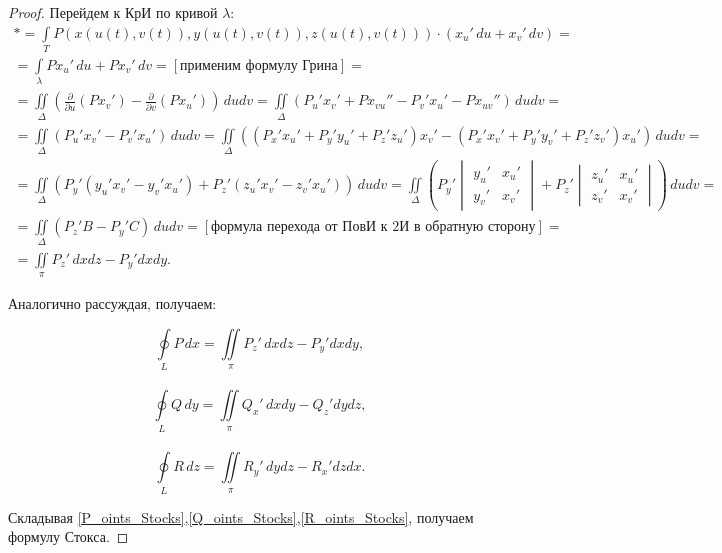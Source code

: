 \documentclass[../../main.tex]{subfiles}
\begin{document}
\begin{proof}
			 Перейдем к КрИ по кривой $\lambda$:
			 \begin{gather*}
			 * = \int \limits_T P ( x( u( t), v( t)   ), y( u( t), v( t)   )  ,z( u( 
			 t), v( t)   ) )\cdot( x_u' \, du + x_v ' \, dv ) =  \\
			 = \int \limits_{\lambda} P x_u' \, du +  P x_v' \, dv =  \left[   
			 \text{применим формулу Грина}  \right] = \\
			 = \iint \limits_{\Delta} \left( \frac{\partial}{\partial{u}} (P x_v') - 
			 \frac{\partial}{\partial{v}} (P x_u') \right) \, du dv = \iint 
			 \limits_{\Delta} \left(
			 P_u' x_v ' + P x_{vu} '' - P_v' x_u' - P x_{uv}'' \right) \, du dv  =  \\
			 = \iint \limits_{\Delta} \left(
			 P_u' x_v ' - P_v' x_u' \right) \, du dv  = \iint \limits_{\Delta} \left( 
			 \left( P_x' x_u' + P_y' y_u' + P_z ' z_u' \right) x_v' - \left( P_x' x_v' 
			 + P_y' y_v' + P_z ' z_v' \right) x_u'  \right) \, du dv =  \\
			 = \iint \limits_{\Delta} \left( P_y'\left( y_u' x_v' - y_v' x_u' \right) + 
			 P_z'\left( z_u' x_v' - z_v' x_u' \right)   \right) \, du dv = \iint 
			 \limits_{\Delta} \left( P_y' \begin{vmatrix} y_u' & x_u' \\ y_v' & x_v'  
			 \end{vmatrix} + P_z' \begin{vmatrix} z_u' & x_u' \\ z_v' & x_v'  
			 \end{vmatrix} \right) \, dudv =      \\
			 = \iint \limits_{\Delta}  \left( P_z' B - P_y' C  \right) \, dudv = 
			 [\text{формула перехода от ПовИ к 2И в обратную сторону}] = \\ = \iint 
			 \limits_{\pi}  P_z' \, dxdz - P_y' dxdy.     \end{gather*}
			
			Аналогично рассуждая, получаем:
			
			 \begin{equation} \label{P_oints_Stocks} \oint \limits_L P \, dx = \iint 
			 \limits_{\pi}  P_z' \, dxdz - P_y' dxdy, \end{equation}\\
			\begin{equation}  \label{Q_oints_Stocks} \oint \limits_L Q \, dy = \iint 
			\limits_{\pi}  Q_x' \, dxdy - Q_z' dydz, \end{equation}\\
			\begin{equation}  \label{R_oints_Stocks} \oint \limits_L R \, dz = \iint 
			\limits_{\pi}  R_y' \, dydz - R_x' dzdx. \end{equation}
			
			Складывая 
			\eqref{P_oints_Stocks},\eqref{Q_oints_Stocks},\eqref{R_oints_Stocks}, 
			получаем формулу Стокса.
		\end{proof}	
			
\end{document}
